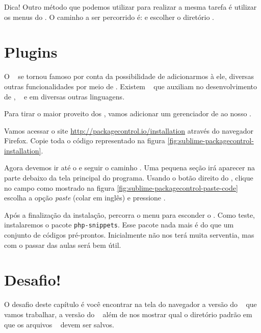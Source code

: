 Dica! Outro método que podemos utilizar para realizar a mesma tarefa é utilizar
os menus do \sublime. O caminho a ser percorrido é: 
e escolher o diretório .

\section{Plugins}
\label{plugins}

O \sublime~ se tornou famoso por conta da possibilidade de adicionarmos à ele,
diversas outras funcionalidades por meio de \plugins. Existem \plugins~ que auxiliam
no desenvolvimento de \html, \css~ e em diversas outras linguagens.

Para tirar o maior proveito dos \plugins, vamos adicionar um gerenciador de
\plugins ao nosso \sublime.

Vamos acessar o site \url{http://packagecontrol.io/installation} através do navegador 
Firefox. Copie toda o código representado na figura \ref{fig:sublime-packagecontrol-installation}.

Agora devemos ir até o \sublime e seguir o caminho .
Uma pequena seção irá aparecer na parte debaixo da tela principal do programa.
Usando o botão direito do \mouse, clique no campo como mostrado na figura 
\ref{fig:sublime-packagecontrol-paste-code} escolha a opção \textit{paste} (colar em inglês)
e pressione \avancar.


Após a finalização da instalação, percorra o menu  para
esconder o \terminal. Como teste, instalaremos o pacote \texttt{php-snippets}. Esse
pacote nada mais é do que um conjunto de códigos pré-prontos. Inicialmente não
nos terá muita serventia, mas com o passar das aulas será bem útil.

\section{Desafio!}
\label{desafio}
O desafio deste capítulo é você encontrar na tela do navegador a versão do \php~
que vamos trabalhar, a versão do \apache~ além de nos mostrar qual o diretório
padrão em que os arquivos \phpextensao~ devem ser salvos.